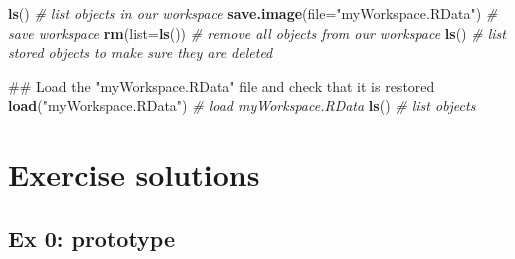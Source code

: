 \documentclass[]{book}
\newenvironment{Shaded}{\begin{snugshade}}{\end{snugshade}}
\newcommand{\KeywordTok}[1]{\textcolor[rgb]{0.13,0.29,0.53}{\textbf{#1}}}
\newcommand{\DataTypeTok}[1]{\textcolor[rgb]{0.13,0.29,0.53}{#1}}
\newcommand{\StringTok}[1]{\textcolor[rgb]{0.31,0.60,0.02}{#1}}
\newcommand{\CommentTok}[1]{\textcolor[rgb]{0.56,0.35,0.01}{\textit{#1}}}
\newcommand{\NormalTok}[1]{#1}
\begin{document}
\begin{Shaded}
\begin{Highlighting}[]
\KeywordTok{ls}\NormalTok{() }\CommentTok{# list objects in our workspace}
\KeywordTok{save.image}\NormalTok{(}\DataTypeTok{file=}\StringTok{"myWorkspace.RData"}\NormalTok{) }\CommentTok{# save workspace }
\KeywordTok{rm}\NormalTok{(}\DataTypeTok{list=}\KeywordTok{ls}\NormalTok{()) }\CommentTok{# remove all objects from our workspace }
\KeywordTok{ls}\NormalTok{() }\CommentTok{# list stored objects to make sure they are deleted}
\end{Highlighting}
\end{Shaded}

\begin{Shaded}
\begin{Highlighting}[]
\NormalTok{## Load the "myWorkspace.RData" file and check that it is restored}
\KeywordTok{load}\NormalTok{(}\StringTok{"myWorkspace.RData"}\NormalTok{) }\CommentTok{# load myWorkspace.RData}
\KeywordTok{ls}\NormalTok{() }\CommentTok{# list objects}
\end{Highlighting}
\end{Shaded}

\section{Exercise solutions}\label{exercise-solutions}

\subsection{Ex 0: prototype}\label{ex-0-prototype}
\end{document}
